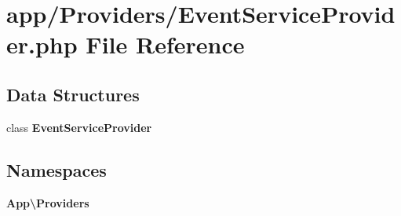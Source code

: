 \section{app/\+Providers/\+Event\+Service\+Provider.php File Reference}
\label{app_2_providers_2_event_service_provider_8php}
\subsection*{Data Structures}
\begin{DoxyCompactItemize}
\item 
class {\bf Event\+Service\+Provider}
\end{DoxyCompactItemize}
\subsection*{Namespaces}
\begin{DoxyCompactItemize}
\item 
 {\bf App\textbackslash{}\+Providers}
\end{DoxyCompactItemize}
